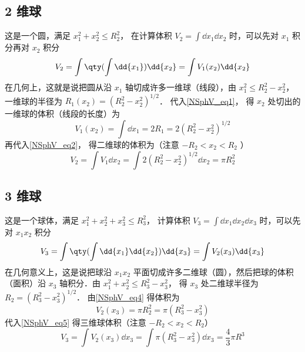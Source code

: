 \subsection{ 2 维球}
这是一个圆，满足 $x_1^2 + x_2^2 \leqslant R_2^2$， 在计算体积 $V_2 = \int \dd{x_1}\dd{x_2}$ 时，可以先对 $x_1$ 积分再对 $x_2$ 积分
\begin{equation}\label{NSphV_eq2}
V_2 = \int \qty(\int \dd{x_1}) \dd{x_2}  = \int V_1(x_2) \dd{x_2}
\end{equation}
在几何上，这就是说把圆从沿 $x_1$ 轴切成许多一维球（线段），由 $x_1^2 \leqslant R_2^2 - x_2^2$， 一维球的半径为 $R_1(x_2) = (R_2^2 - x_2^2)^{1/2}$． 代入\autoref{NSphV_eq1}， 得 $x_2$ 处切出的一维球的体积（线段的长度）为
\begin{equation}\label{NSphV_eq3}
V_1 (x_2) = \int \dd{x_1} = 2R_1 = 2(R_2^2 - x_2^2)^{1/2}
\end{equation}
再代入\autoref{NSphV_eq2}， 得二维球的体积为（注意 $ -R_2 < x_2 < R_2$ ）
\begin{equation}\label{NSphV_eq4}
V_2 = \int V_1 \dd{x_2} = \int 2 (R_2^2 - x_2^2)^{1/2} \dd{x_2}  = \pi R_2^2
\end{equation}
\subsection{ 3 维球}
这是一个球体，满足 $x_1^2 + x_2^2 + x_3^2 \leqslant R_3^2$， 计算体积 $V_3 = \int \dd{x_1}\dd{x_2} \dd{x_3}$ 时，可以先对 $x_1 x_2$ 积分
\begin{equation}\label{NSphV_eq5}
V_3 = \int \qty(\int \dd{x_1} \dd{x_2}) \dd{x_3} = \int V_2(x_3) \dd{x_3}
\end{equation}
在几何意义上，这是说把球沿 $x_1 x_2$ 平面切成许多二维球（圆），然后把球的体积（面积）沿 $x_3$ 轴积分．由 $x_1^2 + x_2^2 \leqslant R_3^2 - x_3^2$， 得 $x_3$ 处二维球半径为 $R_2 = (R_3^2 - x_3^2)^{1/2}$． 由\autoref{NSphV_eq4} 得体积为
\begin{equation}\label{NSphV_eq6}
V_2 (x_3) = \pi R_2^2 = \pi (R_3^2 - x_3^2)
\end{equation}
代入\autoref{NSphV_eq5} 得三维球体积（注意 $-R_2 < x_2 < R_2$）
\begin{equation}\label{NSphV_eq7}
V_3 = \int V_2(x_3) \dd{x_3} = \int \pi (R_3^2 - x_3^2)\dd{x_3}  = \frac43 \pi R^3
\end{equation}

